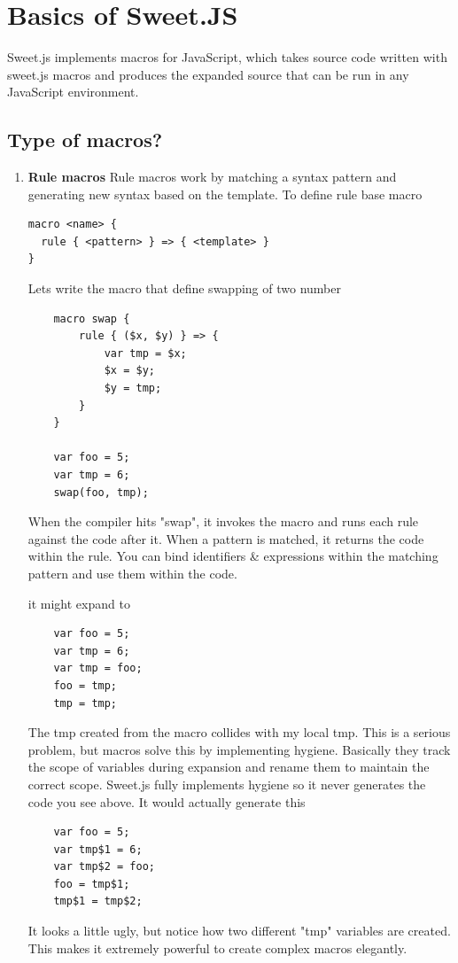 \chapter{Basics of Sweet.JS}

Sweet.js implements macros for JavaScript, which takes source code written with sweet.js macros and produces the expanded source that can be run in any JavaScript environment. 
\section{Type of macros?}
\begin{enumerate}
\item {\bf Rule macros }
Rule macros work by matching a syntax pattern and generating new syntax based on the template.
To define rule base macro
\begin{lstlisting}
macro <name> {
  rule { <pattern> } => { <template> }
}
\end{lstlisting} 

Lets write the macro that define swapping of two number
\begin{lstlisting}
	macro swap {
    	rule { ($x, $y) } => {
        	var tmp = $x;
        	$x = $y;
        	$y = tmp;
    	}
	}

	var foo = 5;
	var tmp = 6;
	swap(foo, tmp);
\end{lstlisting} 

When the compiler hits "swap", it invokes the macro and runs each rule against the code after it. When a pattern is matched, it returns the code within the rule. You can bind identifiers \& expressions within the matching pattern and use them within the code.

it might expand to 
\begin{lstlisting}
	var foo = 5;
	var tmp = 6;
	var tmp = foo;
	foo = tmp;
	tmp = tmp;
\end{lstlisting} 
The tmp created from the macro collides with my local tmp. This is a serious problem, but macros solve this by implementing hygiene. Basically they track the scope of variables during expansion and rename them to maintain the correct scope. Sweet.js fully implements hygiene so it never generates the code you see above. It would actually generate this
\begin{lstlisting}
	var foo = 5;
	var tmp$1 = 6;
	var tmp$2 = foo;
	foo = tmp$1;
	tmp$1 = tmp$2;
\end{lstlisting} 
It looks a little ugly, but notice how two different "tmp" variables are created. This makes it extremely powerful to create complex macros elegantly.


\end{enumerate}
